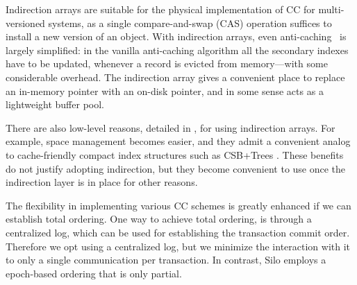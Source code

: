 Indirection arrays are suitable for the physical implementation of CC for multi-versioned systems, as a single compare-and-swap (CAS) operation suffices to install a new version of an object. 
With indirection arrays, even anti-caching~\cite{DeBrabantPTSZ13} is largely simplified: in the vanilla anti-caching algorithm all the secondary indexes have to be updated, whenever a record is evicted from memory---with some considerable overhead. The indirection array gives a convenient place to replace an in-memory pointer with an on-disk pointer, and in some sense acts as a lightweight buffer pool. 

There are also low-level reasons, detailed in , for using indirection arrays. For example, space management becomes easier, and they admit a convenient analog to cache-friendly compact index structures such as CSB+Trees \cite{RaoR00}. These benefits do not justify adopting indirection, but they become convenient to use once the indirection layer is in place for other reasons.

The flexibility in implementing various CC schemes is greatly enhanced if we can establish total ordering. One way to achieve total ordering, is through a centralized log, which can be used for establishing the transaction commit order. Therefore we opt using a centralized log, but we minimize the interaction with it to only a single communication per transaction. 
In contrast, Silo employs a epoch-based ordering that is only partial. 

